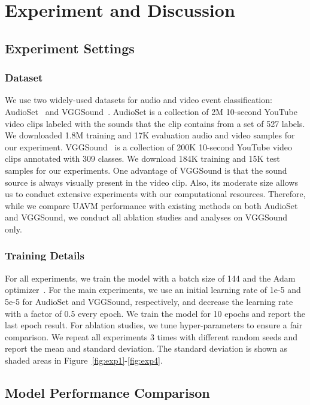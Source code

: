 \documentclass[journal]{IEEEtran}
\newcommand{\squeezeup}{\vspace{-1.6mm}}
\begin{document}
\squeezeup
\section{Experiment and Discussion}

\subsection{Experiment Settings}

\subsubsection{Dataset}

We use two widely-used datasets for audio and video event classification: AudioSet~\cite{gemmeke2017audio} and VGGSound~\cite{chen2020vggsound}. AudioSet is a collection of 2M 10-second YouTube video clips labeled with the sounds that the clip contains from a set of 527 labels. We downloaded 1.8M training and 17K evaluation audio and video samples for our experiment. VGGSound~\cite{chen2020vggsound} is a collection of 200K 10-second YouTube video clips annotated with 309 classes. We download 184K training and 15K test samples for our experiments. One advantage of VGGSound is that the sound source is always visually present in the video clip. Also, its moderate size allows us to conduct extensive experiments with our computational resources. Therefore, while we compare UAVM performance with existing methods on both AudioSet and VGGSound, we conduct all ablation studies and analyses on VGGSound only.

\subsubsection{Training Details}

For all experiments, we train the model with a batch size of 144 and the Adam optimizer~\cite{kingma2015adam}. For the main experiments, we use an initial learning rate of 1e-5 and 5e-5 for AudioSet and VGGSound, respectively, and decrease the learning rate with a factor of 0.5 every epoch. We train the model for 10 epochs and report the last epoch result. For ablation studies, we tune hyper-parameters to ensure a fair comparison. We repeat all experiments 3 times with different random seeds and report the mean and standard deviation. The standard deviation is shown as shaded areas in Figure~\ref{fig:exp1}-\ref{fig:exp4}.


\squeezeup\squeezeup
\subsection{Model Performance Comparison}
\end{document}

